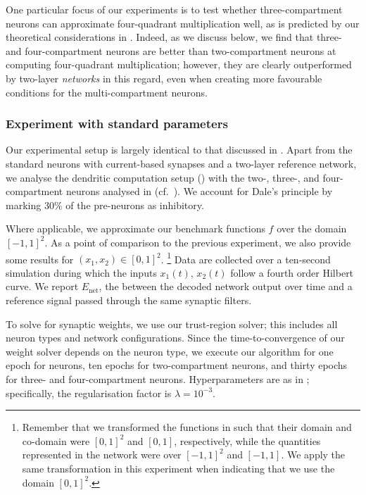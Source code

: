 One particular focus of our experiments is to test whether three-compartment neurons can approximate four-quadrant multiplication well, as is predicted by our theoretical considerations in .
Indeed, as we discuss below, we find that three- and four-compartment neurons are better than two-compartment neurons at computing four-quadrant multiplication; however, they are clearly outperformed by two-layer \emph{networks} in this regard, even when creating more favourable conditions for the multi-compartment neurons.

\subsubsection{Experiment with standard parameters}
Our experimental setup is largely identical to that discussed in .
Apart from the standard \LIF neurons with current-based synapses and a two-layer \LIF reference network, we analyse the dendritic computation setup () with the two-, three-, and four-compartment neurons analysed in  (cf.~).
We account for Dale's principle by marking $30\%$ of the pre-neurons as inhibitory.

Where applicable, we approximate our benchmark functions $f$ over the domain $[-1, 1]^2$.
As a point of comparison to the previous experiment, we also provide some results for $(x_1, x_2) \in [0, 1]^2$.%
\footnote{
Remember that we transformed the functions in  such that their domain and co-domain were $[0, 1]^2$ and $[0, 1]$, respectively, while the quantities represented in the network were over $[-1, 1]^2$ and $[-1, 1]$.
We apply the same transformation in this experiment when indicating that we use the domain $[0, 1]^2$.
}
Data are collected over a ten-second simulation during which the inputs $x_1(t)$, $x_2(t)$ follow a fourth order Hilbert curve.
We report $E_\mathrm{net}$, the \NRMSE between the decoded network output over time and a reference signal passed through the same synaptic filters.

To solve for synaptic weights, we use our trust-region \SQP solver; this includes all neuron types and network configurations.
Since the time-to-convergence of our weight solver depends on the neuron type, we execute our algorithm for one epoch for \LIF neurons, ten epochs for two-compartment \LIF neurons, and thirty epochs for three- and four-compartment neurons.
Hyperparameters are as in ; specifically, the regularisation factor is $\lambda = 10^{-3}$.

